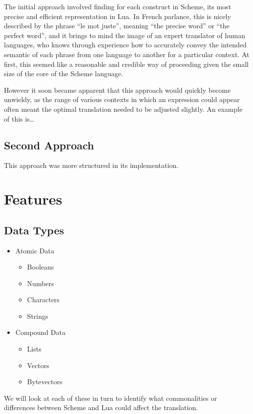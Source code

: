 The initial approach involved finding for each construct in Scheme, its most
precise and efficient representation in Lua. In French parlance, this is nicely
described by the phrase ``le mot juste'', meaning ``the precise word'' or ``the
perfect word'', and it brings to mind the image of an expert translator of
human languages, who knows through experience how to accurately convey the
intended semantic of each phrase from one language to another for a particular
context.  At first, this seemed like a reasonable and credible way of
proceeding given the small size of the core of the Scheme language.

However it soon became apparent that this approach would quickly become
unwieldy, as the range of various contexts in which an expression could appear
often meant the optimal translation needed to be adjusted slightly. An example
of this is\ldots

\subsection{Second Approach}
This approach was more structured in its implementation.


\section{Features}

\subsection{Data Types}

\begin{itemize}
\item Atomic Data
\begin{itemize}
\item Booleans
\item Numbers
\item Characters
\item Strings
\end{itemize}
\item Compound Data
\begin{itemize}
\item Lists
\item Vectors
\item Bytevectors
\end{itemize}
\end{itemize}

We will look at each of these in turn to identify what commonalities or
differences between Scheme and Lua could affect the translation.

